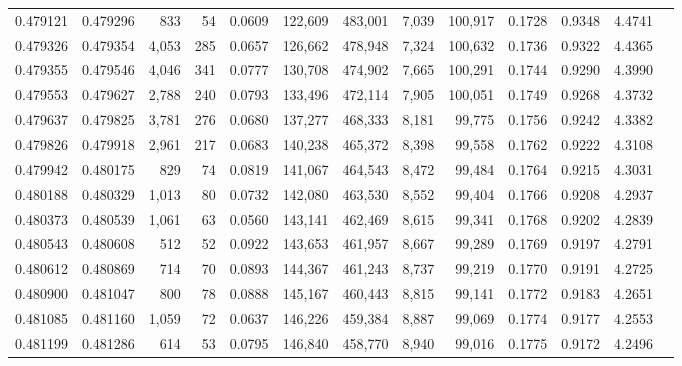 \begin{tabular}{rrrrrrrrrrrrr}
0.479121 & 0.479296 &   833 &    54 &                                     0.0609 & 122,609 & 483,001 &   7,039 & 100,917 & 0.1728 & 0.9348 & 4.4741 \\
0.479326 & 0.479354 & 4,053 &   285 &                                     0.0657 & 126,662 & 478,948 &   7,324 & 100,632 & 0.1736 & 0.9322 & 4.4365 \\
0.479355 & 0.479546 & 4,046 &   341 &                                     0.0777 & 130,708 & 474,902 &   7,665 & 100,291 & 0.1744 & 0.9290 & 4.3990 \\
0.479553 & 0.479627 & 2,788 &   240 &                                     0.0793 & 133,496 & 472,114 &   7,905 & 100,051 & 0.1749 & 0.9268 & 4.3732 \\
0.479637 & 0.479825 & 3,781 &   276 &                                     0.0680 & 137,277 & 468,333 &   8,181 &  99,775 & 0.1756 & 0.9242 & 4.3382 \\
0.479826 & 0.479918 & 2,961 &   217 &                                     0.0683 & 140,238 & 465,372 &   8,398 &  99,558 & 0.1762 & 0.9222 & 4.3108 \\
0.479942 & 0.480175 &   829 &    74 &                                     0.0819 & 141,067 & 464,543 &   8,472 &  99,484 & 0.1764 & 0.9215 & 4.3031 \\
0.480188 & 0.480329 & 1,013 &    80 &                                     0.0732 & 142,080 & 463,530 &   8,552 &  99,404 & 0.1766 & 0.9208 & 4.2937 \\
0.480373 & 0.480539 & 1,061 &    63 &                                     0.0560 & 143,141 & 462,469 &   8,615 &  99,341 & 0.1768 & 0.9202 & 4.2839 \\
0.480543 & 0.480608 &   512 &    52 &                                     0.0922 & 143,653 & 461,957 &   8,667 &  99,289 & 0.1769 & 0.9197 & 4.2791 \\
0.480612 & 0.480869 &   714 &    70 &                                     0.0893 & 144,367 & 461,243 &   8,737 &  99,219 & 0.1770 & 0.9191 & 4.2725 \\
0.480900 & 0.481047 &   800 &    78 &                                     0.0888 & 145,167 & 460,443 &   8,815 &  99,141 & 0.1772 & 0.9183 & 4.2651 \\
0.481085 & 0.481160 & 1,059 &    72 &                                     0.0637 & 146,226 & 459,384 &   8,887 &  99,069 & 0.1774 & 0.9177 & 4.2553 \\
0.481199 & 0.481286 &   614 &    53 &                                     0.0795 & 146,840 & 458,770 &   8,940 &  99,016 & 0.1775 & 0.9172 & 4.2496 \\

\end{tabular}
